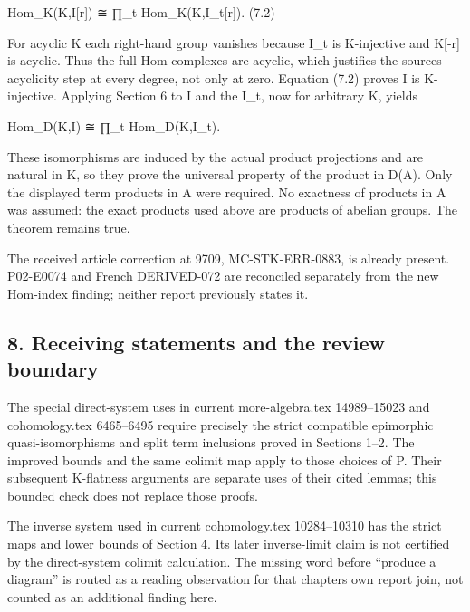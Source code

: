 \documentclass[11pt]{article}
\begin{document}
Hom\_\allowbreak{}K(K,\allowbreak{}I[r]\allowbreak{})\allowbreak{} ≅ ∏\_\allowbreak{}t Hom\_\allowbreak{}K(K,\allowbreak{}I\_\allowbreak{}t[r]\allowbreak{})\allowbreak{}. (7.2)\allowbreak{}

For acyclic K each right-hand group vanishes because I\_\allowbreak{}t is K-injective and K[-r]\allowbreak{} is acyclic. Thus the full Hom complexes are acyclic,\allowbreak{} which justifies the source\textquotesingle s acyclicity step at every degree,\allowbreak{} not only at zero. Equation (7.2)\allowbreak{} proves I is K-injective. Applying Section 6 to I and the I\_\allowbreak{}t,\allowbreak{} now for arbitrary K,\allowbreak{} yields

Hom\_\allowbreak{}D(K,\allowbreak{}I)\allowbreak{} ≅ ∏\_\allowbreak{}t Hom\_\allowbreak{}D(K,\allowbreak{}I\_\allowbreak{}t)\allowbreak{}.

These isomorphisms are induced by the actual product projections and are natural in K,\allowbreak{} so they prove the universal property of the product in D(A)\allowbreak{}. Only the displayed term products in A were required. No exactness of products in A was assumed:\allowbreak{} the exact products used above are products of abelian groups. The theorem remains true.

The received article correction at 9709,\allowbreak{} MC-STK-ERR-0883,\allowbreak{} is already present. P02-E0074 and French DERIVED-072 are reconciled separately from the new Hom-index finding; neither report previously states it.

\subsection{8. Receiving statements and the review boundary}\label{proofs-9206-9744-receiving-statements-and-the-review-boundary}

The special direct-system uses in current more-algebra.tex 14989–\allowbreak{}15023 and cohomology.tex 6465–\allowbreak{}6495 require precisely the strict compatible epimorphic quasi-isomorphisms and split term inclusions proved in Sections 1–\allowbreak{}2. The improved bounds and the same colimit map apply to those choices of P. Their subsequent K-flatness arguments are separate uses of their cited lemmas; this bounded check does not replace those proofs.

The inverse system used in current cohomology.tex 10284–\allowbreak{}10310 has the strict maps and lower bounds of Section 4. Its later inverse-limit claim is not certified by the direct-system colimit calculation. The missing word before ``produce a diagram'' is routed as a reading observation for that chapter\textquotesingle s own report join,\allowbreak{} not counted as an additional finding here.
\end{document}

